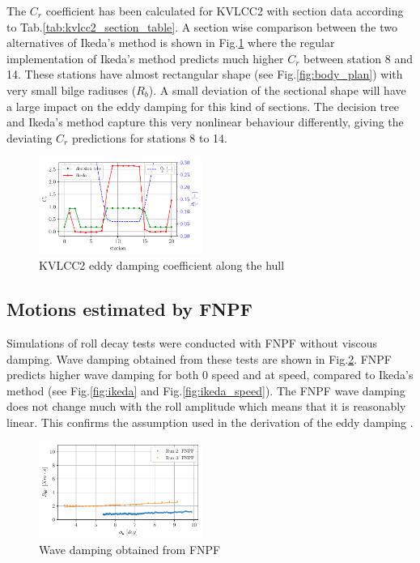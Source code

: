 The $C_r$ coefficient has been calculated for KVLCC2 with section data
according to Tab.\ref{tab:kvlcc2_section_table}. A section wise
comparison between the two alternatives of Ikeda's method is shown in
Fig.\ref{fig:kvlcc2_eddy} where the regular implementation of
Ikeda's method predicts much higher $C_r$ between station 8 and 14.
These stations have almost rectangular shape (see
Fig.\ref{fig:body_plan}) with very small bilge radiuses
($R_b$). A small deviation of the sectional shape will have a large
impact on the eddy damping for this kind of sections. The decision tree
and Ikeda's method capture this very nonlinear behaviour differently,
giving the deviating $C_r$ predictions for stations 8 to 14.
\begin{figure}[H]
\begin{center}\includegraphics[width = 0.475\textwidth]{figures/kvlcc2_eddy.pdf}\end{center}
\vspace{-0.7cm}
\caption{KVLCC2 eddy damping coefficient along the hull}
\label{fig:kvlcc2_eddy}
\end{figure}
\subsection*{Motions estimated by FNPF}\label{motions-estimated-by-fnpf}
Simulations of roll decay tests were conducted with FNPF without viscous
damping. Wave damping obtained from these tests are shown in
Fig.\ref{fig:fnpf}. FNPF predicts higher wave damping for both 0
speed and at speed, compared to Ikeda's method (see
Fig.\ref{fig:ikeda} and Fig.\ref{fig:ikeda_speed}). The
FNPF wave damping does not change much with the roll amplitude which
means that it is reasonably linear. This confirms the assumption used in
the derivation of the eddy damping \citep{7505983/4AFVVGNT}.
\begin{figure}[H]
\begin{center}\includegraphics[width = 0.475\textwidth]{figures/fnpf.pdf}\end{center}
\vspace{-0.7cm}
\caption{Wave damping obtained from FNPF}
\label{fig:fnpf}
\end{figure}
